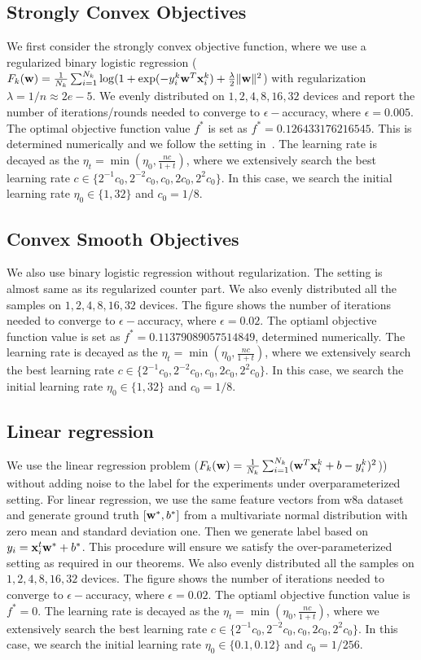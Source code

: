 \subsection{Strongly Convex Objectives}
We first consider the strongly convex objective function, where we use
a regularized binary logistic regression ($F_k({\mathbf{w}}) =
\frac{1}{N_k} \sum_{i=1}^{N_k} \log( 1+ \exp(-y_i^k {\mathbf{w}}^T{\mathbf{x}}_i^k) + \frac{\lambda}{2}
\|{\mathbf{w}}\|^2$) with regularization $\lambda=1/n\approx 2e-5$. We evenly distributed on $1, 2, 4, 8, 16, 32$ devices and  report the number of iterations/rounds needed to converge to $\epsilon-$accuracy, where $\epsilon=0.005$. The optimal objective function value $f^*$
is set as $f^* = 0.126433176216545$. This is determined numerically and we follow the setting in~\cite{stich2018local}. The learning rate is decayed as the $\eta_t = \min(\eta_0, \frac{nc}{1 + t})$, where we extensively search the best learning rate $c \in \{2^{-1}c_0, 2^{-2}c_0, c_0, 2c_0, 2^{2}c_0\}$. In this case, we search the initial learning rate $\eta_0\in \{1, 32\}$ and $c_0 = 1/8$.


\subsection{Convex Smooth Objectives}
We also use binary logistic regression without regularization.
The setting is almost same as its regularized counter part. We also evenly distributed all the samples on $1, 2, 4, 8, 16, 32$ devices. The figure shows the number of iterations needed to converge to $\epsilon-$accuracy, where $\epsilon=0.02$. The optiaml objective function value is set as $f^*=0.11379089057514849$, determined numerically. 
The learning rate is decayed as the $\eta_t = \min(\eta_0, \frac{nc}{1 + t})$, where we extensively search the best learning rate $c \in \{2^{-1}c_0, 2^{-2}c_0, c_0, 2c_0, 2^{2}c_0\}$. In this case, we search the initial learning rate $\eta_0\in \{1, 32\}$ and $c_0 = 1/8$.


\subsection{Linear regression}
We use the linear regression problem ($F_k({\mathbf{w}}) =
\frac{1}{N_k} \sum_{i=1}^{N_k} ({\mathbf{w}}^T{\mathbf{x}}_i^k + b  - y_i^k)^2$)) without adding noise to the label
for the experiments under overparameterized setting.
For linear regression, we use the same feature vectors from w8a dataset 
and generate ground truth $[{\mathbf{w}}^*, b^*]$ from a multivariate normal distribution
with zero mean and standard deviation one. Then we generate label 
based on $y_i = {\mathbf{x}}_i^t{\mathbf{w}}^* + b^*$. This procedure will ensure we satisfy
the over-parameterized setting as required in our theorems. 
We also evenly distributed all the samples on $1, 2, 4, 8, 16, 32$ devices. The figure shows the number of iterations needed to converge to $\epsilon-$accuracy, where $\epsilon=0.02$. The optiaml objective function value is $f^*=0$. 
The learning rate is decayed as the $\eta_t = \min(\eta_0, \frac{nc}{1 + t})$, where we extensively search the best learning rate $c \in \{2^{-1}c_0, 2^{-2}c_0, c_0, 2c_0, 2^{2}c_0\}$. In this case, we search the initial learning rate $\eta_0\in \{0.1, 0.12\}$ and $c_0 = 1/256$.


